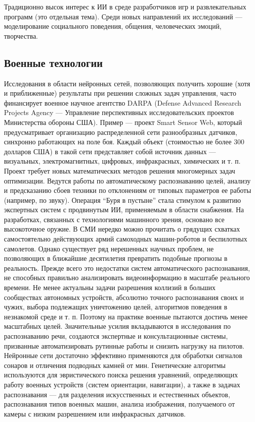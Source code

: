 Традиционно высок интерес к ИИ в среде разработчиков игр и развлекательных программ (это отдельная тема). Среди новых направлений их исследований --- моделирование социального поведения, общения, человеческих эмоций, творчества.

\subsection{Военные технологии}

Исследования в области нейронных сетей, позволяющих получить хорошие (хотя и приближенные) результаты при решении сложных задач управления, часто финансирует военное научное агентство DARPA (Defense Advanced Research Projects Agency --- Управление перспективных исследовательских проектов Министерства обороны США). Пример --- проект Smart Sensor Web, который предусматривает организацию распределенной сети разнообразных датчиков, синхронно работающих на поле боя. Каждый объект (стоимостью не более 300 долларов США) в такой сети представляет собой источник данных --- визуальных, электромагнитных, цифровых, инфракрасных, химических и т. п. Проект требует новых математических методов решения многомерных задач оптимизации. Ведутся работы по автоматическому распознаванию целей, анализу и предсказанию сбоев техники по отклонениям от типовых параметров ее работы (например, по звуку). Операция ``Буря в пустыне'' стала стимулом к развитию экспертных систем с продвинутым ИИ, применяемым в области снабжения. На разработках, связанных с технологиями машинного зрения, основано все высокоточное оружие. В СМИ нередко можно прочитать о грядущих схватках самостоятельно действующих армий самоходных машин-роботов и беспилотных самолетов. Однако существует ряд нерешенных научных проблем, не позволяющих в ближайшие десятилетия превратить подобные прогнозы в реальность. Прежде всего это недостатки систем автоматического распознавания, не способных правильно анализировать видеоинформацию в масштабе реального времени. Не менее актуальны задачи разрешения коллизий в больших сообществах автономных устройств, абсолютно точного распознавания своих и чужих, выбора подлежащих уничтожению целей, алгоритмов поведения в незнакомой среде и т. п. Поэтому на практике военные пытаются достичь менее масштабных целей. Значительные усилия вкладываются в исследования по распознаванию речи, создаются экспертные и консультационные системы, призванные автоматизировать рутинные работы и снизить нагрузку на пилотов. Нейронные сети достаточно эффективно применяются для обработки сигналов сонаров и отличения подводных камней от мин. Генетические алгоритмы используются для эвристического поиска решения уравнений, определяющих работу военных устройств (систем ориентации, навигации), а также в задачах распознавания --- для разделения искусственных и естественных объектов, распознавания типов военных машин, анализа изображения, получаемого от камеры с низким разрешением или инфракрасных датчиков.
